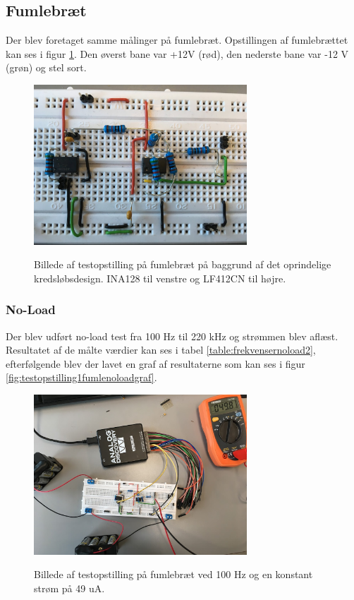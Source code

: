 \subsection{Fumlebræt}

Der blev foretaget samme målinger på fumlebræt. Opstillingen af fumlebrættet kan ses i figur \ref{fig:oprindeligekredslob2}. Den øverst bane var +12V (rød), den nederste bane var -12 V (grøn) og stel sort.  


\begin{figure}[H]
\centering
{\includegraphics[width=8cm]
{Figure/oprindeligekredslob2}}
\caption{Billede af testopstilling på fumlebræt på baggrund af det oprindelige kredsløbsdesign. INA128 til venstre og LF412CN til højre.}
\label{fig:oprindeligekredslob2}
\end{figure}


\subsubsection{No-Load}
Der blev udført no-load test fra 100 Hz til 220 kHz og strømmen blev aflæst. Resultatet af de målte værdier kan ses i tabel \ref{table:frekvensernoload2}, efterfølgende blev der lavet en graf af resultaterne som kan ses i figur \ref{fig:testopstilling1fumlenoloadgraf}.


\begin{figure}[H]
\centering
{\includegraphics[width=8cm]
{Figure/oprindeligekredslobfumle1}}
\caption{Billede af testopstilling på fumlebræt ved 100 Hz og en konstant strøm på 49 uA.}
\label{fig:oprindeligekredslobfumle1}
\end{figure}





